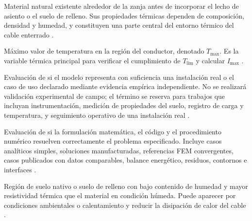 \documentclass[11pt,a4paper,oneside]{report}
\newcommand{\tesisbodyfont}{\fontsize{11}{13.6}\selectfont}
\newcommand{\Tmax}{T_{\max}}
\newcommand{\Imax}{I_{\max}}
\begin{document}
\begin{description}[style=nextline,itemsep=0.5\baselineskip,parsep=0pt,topsep=0.25\baselineskip]
  \item[Suelo nativo.] Material natural existente alrededor de la zanja antes de incorporar el lecho de asiento o el suelo de relleno. Sus propiedades térmicas dependen de composición, densidad y humedad, y constituyen una parte central del entorno térmico del cable enterrado \parencites{farouki1981thermal,devries1966thermal}[1,6--9]{khumalo2025}[secciones 4--6]{ieee442}.

  \item[Temperatura máxima del conductor.] Máximo valor de temperatura en la región del conductor, denotado $\Tmax$. Es la variable térmica principal para verificar el cumplimiento de $T_{\mathrm{lim}}$ y calcular $\Imax$ \parencites[752--760]{neher1957}{anders2005}[cláusulas 4--5]{iec60287}[3--6]{enescu2021}.

  \item[Validación.] Evaluación de si el modelo representa con suficiencia una instalación real o el caso de uso declarado mediante evidencia empírica independiente. No se realizará validación experimental de campo; el término se reserva para trabajos que incluyan instrumentación, medición de propiedades del suelo, registro de carga y temperatura, y seguimiento operativo de una instalación real \parencites{cigre2022}[93--99]{cigre2025}[350--351]{gregor2013}.

  \item[Verificación.] Evaluación de si la formulación matemática, el código y el procedimiento numérico resuelven correctamente el problema especificado. Incluye casos analíticos simples, soluciones manufacturadas, referencias FEM convergentes, casos publicados con datos comparables, balance energético, residuos, contornos e interfaces \parencites{cigre2022}[3--4,93--99]{cigre2025}[350--351]{gregor2013}.

  \item[Zona seca.] Región de suelo nativo o suelo de relleno con bajo contenido de humedad y mayor resistividad térmica que el material en condición húmeda. Puede aparecer por condiciones ambientales o calentamiento y reducir la disipación de calor del cable \parencites[4--6]{enescu2021}[1,6--9]{khumalo2025}[14851--14852]{fariz2026}.
\end{description}
\endgroup

\begin{singlespace}
\tesisbodyfont
\printbibliography[heading=subbibnumbered,title={REFERENCIAS}]
\end{singlespace}
\end{document}
